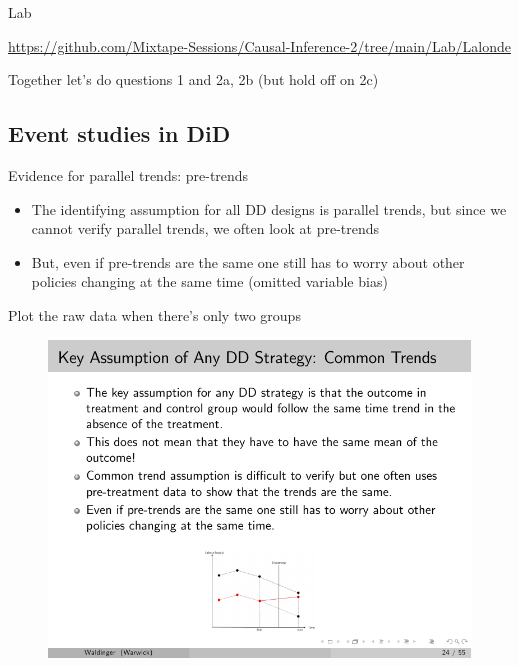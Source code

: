 \documentclass{beamer}
\begin{document}
\begin{frame}{Lab}

\url{https://github.com/Mixtape-Sessions/Causal-Inference-2/tree/main/Lab/Lalonde}

\bigskip

Together let's do questions 1 and 2a, 2b (but hold off on 2c)

\end{frame}



\subsection{Event studies in DiD}



\begin{frame}{Evidence for parallel trends: pre-trends}

\begin{itemize}

	\item The identifying assumption for all DD designs is parallel trends, but since we cannot verify parallel trends, we often look at pre-trends
	\item But, even if pre-trends are the same one still has to worry about other policies changing at the same time (omitted variable bias)

\end{itemize}

\end{frame}


\begin{frame}{Plot the raw data when there's only two groups}

	\begin{figure}
	\includegraphics[scale=2.5]{./lecture_includes/waldinger_dd_6.pdf}
	\end{figure}

\end{frame}
\end{document}
